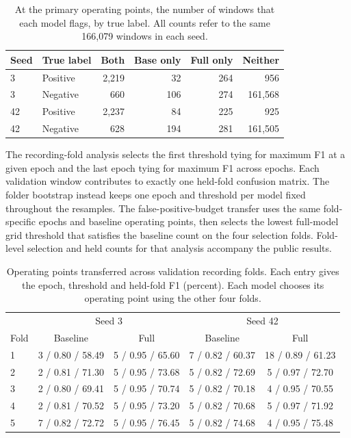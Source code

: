 \documentclass{article}
\begin{document}
\begin{table}[h]\centering\small
\caption{At the primary operating points, the number of windows that each model flags, by true label. All counts refer to the same 166,079 windows in each seed.}\label{tab:appendoverlap}
\begin{tabular}{llrrrr}\toprule
Seed & True label & Both & Base only & Full only & Neither\\\midrule
3 & Positive & 2,219 & 32 & 264 & 956\\
3 & Negative & 660 & 106 & 274 & 161,568\\
42 & Positive & 2,237 & 84 & 225 & 925\\
42 & Negative & 628 & 194 & 281 & 161,505\\\bottomrule
\end{tabular}
\end{table}

The recording-fold analysis selects the first threshold tying for maximum F1 at a given epoch and the last epoch tying for maximum F1 across epochs. Each validation window contributes to exactly one held-fold confusion matrix. The folder bootstrap instead keeps one epoch and threshold per model fixed throughout the resamples. The false-positive-budget transfer uses the same fold-specific epochs and baseline operating points, then selects the lowest full-model grid threshold that satisfies the baseline count on the four selection folds. Fold-level selection and held counts for that analysis accompany the public results.
\begin{table}[h]\centering\small
\caption{Operating points transferred across validation recording folds. Each entry gives the epoch, threshold and held-fold F1 (percent). Each model chooses its operating point using the other four folds.}\label{tab:folds}
\begin{tabular}{lcccc}\toprule
& \multicolumn{2}{c}{Seed 3} & \multicolumn{2}{c}{Seed 42} \\
Fold & Baseline & Full & Baseline & Full \\\midrule
1 & 3 / 0.80 / 58.49 & 5 / 0.95 / 65.60 & 7 / 0.82 / 60.37 & 18 / 0.89 / 61.23 \\
2 & 2 / 0.81 / 71.30 & 5 / 0.95 / 73.68 & 5 / 0.82 / 72.69 & 5 / 0.97 / 72.70 \\
3 & 2 / 0.80 / 69.41 & 5 / 0.95 / 70.74 & 5 / 0.82 / 70.18 & 4 / 0.95 / 70.55 \\
4 & 2 / 0.81 / 70.52 & 5 / 0.95 / 73.20 & 5 / 0.82 / 70.68 & 5 / 0.97 / 71.92 \\
5 & 7 / 0.82 / 72.72 & 5 / 0.95 / 76.45 & 5 / 0.82 / 74.68 & 4 / 0.95 / 75.48 \\
\bottomrule\end{tabular}
\end{table}
\end{document}
